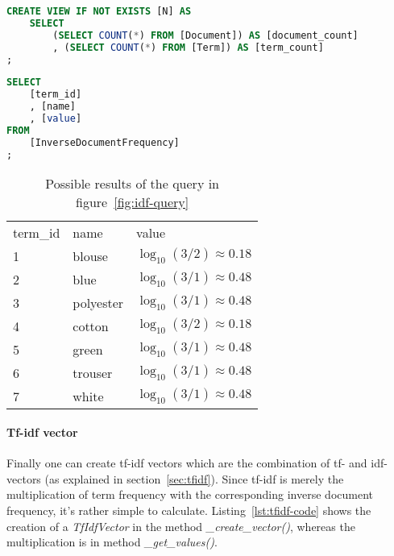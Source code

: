 \begin{lstlisting}[language=SQL,caption={SQL-statement to create the N-view},label={lst:n-view},float=h]
CREATE VIEW IF NOT EXISTS [N] AS
    SELECT
        (SELECT COUNT(*) FROM [Document]) AS [document_count]
        , (SELECT COUNT(*) FROM [Term]) AS [term_count]
;
\end{lstlisting}


\begin{lstlisting}[language=SQL,caption={SQL-query for generating idf-vectors},label={fig:idf-query},float=h]
SELECT
    [term_id]
    , [name]
    , [value]
FROM
    [InverseDocumentFrequency]
;
\end{lstlisting}


\begin{table}
    \center
    \begin{tabular}{ l | l | l }
        \rowcolor{\dustRowHead}
        \multicolumn{3}{ c }{\textbf{idf}}\\\hline
        term\_id    & name      & value\\\hline
        1           & blouse    & $\log_{10}(3/2) \approx 0.18$\\
        2           & blue      & $\log_{10}(3/1) \approx 0.48$\\
        3           & polyester & $\log_{10}(3/1) \approx 0.48$\\
        4           & cotton    & $\log_{10}(3/2) \approx 0.18$\\
        5           & green     & $\log_{10}(3/1) \approx 0.48$\\
        6           & trouser   & $\log_{10}(3/1) \approx 0.48$\\
        7           & white     & $\log_{10}(3/1) \approx 0.48$\\
    \end{tabular}
    \caption{Possible results of the query in figure~\ref{fig:idf-query}}
    \label{tab:idf-query-result}
\end{table}

\paragraph{Tf-idf vector}
Finally one can create tf-idf vectors which are the combination of tf- and idf-vectors (as explained in section~\ref{sec:tfidf}).
Since tf-idf is merely the multiplication of term frequency with the corresponding inverse document frequency, it's rather simple to calculate.
Listing~\ref{lst:tfidf-code} shows the creation of a \textit{TfIdfVector} in the method \textit{\_create\_vector()}, whereas the multiplication is in method \textit{\_get\_values()}.

